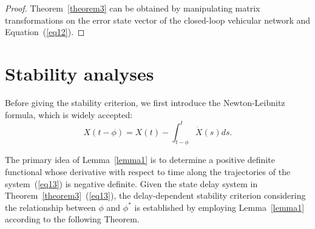 \documentclass[journal]{IEEEtran}
\begin{document}
\begin{proof}
  Theorem~\ref{theorem3} can be obtained by manipulating matrix transformations on the error state vector of the closed-loop vehicular network and Equation~(\ref{eq12}).
\end{proof}







\section{Stability analyses}
\label{Section 4}
Before giving the stability criterion, we first introduce the Newton-Leibnitz formula, which is widely accepted:
\begin{equation}
  X(t - \phi ) = X(t) - \int_{t - \phi }^t {\dot X(s)ds}.
  \label{eq41}
\end{equation}

The primary idea of Lemma~\ref{lemma1} is to determine a positive definite functional whose derivative with respect to time along the trajectories of the system~(\ref{eq13}) is negative definite. Given the state delay system in Theorem~\ref{theorem3}~(\ref{eq13}), the delay-dependent stability criterion considering the relationship between $\phi$ and $\phi^\ast$ is established by employing Lemma~\ref{lemma1} according to the following Theorem.
\end{document}
